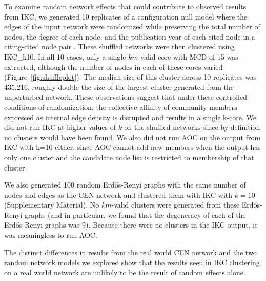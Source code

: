 \documentclass[12pt, oneside]{article}   	%
\begin{document}
	
To examine random network effects that could contribute to observed results from IKC, we generated 10 replicates of a configuration null model where the edges of the input network were randomized while preserving the total number of nodes, the degree of each node,  and the publication year of each cited node in a citing-cited node pair \citep{bradley2020,uzzi2013}. These shuffled networks were then clustered using IKC\_k10. In all 10 cases, only a single $km$-valid core with MCD of 15 was extracted, although the number of nodes in each of these cores varied (Figure~\ref{fig:shuffleplot}).
 The median size of this cluster across 10 replicates was 435,216, roughly double the size of the largest cluster generated from the unperturbed network. These observations suggest that under these controlled conditions of randomization, the collective affinity of community members expressed as internal edge density is disrupted and results in a single k-core. We did not run IKC at higher values of $k$ on the shuffled networks since  by definition no clusters would have been found. We also did not run AOC on the output from IKC with  k=10 either,  since AOC cannot add new members when the output has only one cluster and the candidate node list is restricted to membership of that cluster.

We also generated 100 random Erd\H{o}s-Renyi graphs with the same number of nodes and edges as the CEN network and clustered them with IKC with $k=10$ (Supplementary Material). No $km$-valid clusters were generated from these Erd\H{o}s-Renyi graphs (and in particular, we found that the degeneracy of each of the Erd\H{o}s-Renyi graphs was 9).
Because there were no clusters in the IKC output,  it was meaningless to run AOC.

	
The distinct differences in results from the real world CEN network and the two random network models we explored show that the results seen in IKC clustering on a real world network are unlikely to be the result of random effects alone. 
	
	
	
\end{document}
